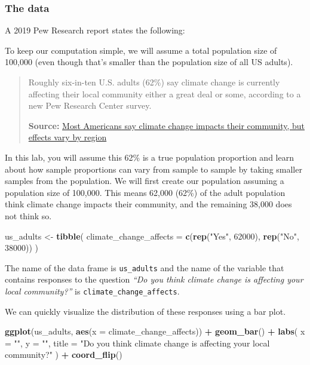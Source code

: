 \documentclass[
]{article}
\newenvironment{Shaded}{\begin{snugshade}}{\end{snugshade}}
\newcommand{\AttributeTok}[1]{\textcolor[rgb]{0.13,0.29,0.53}{#1}}
\newcommand{\DecValTok}[1]{\textcolor[rgb]{0.00,0.00,0.81}{#1}}
\newcommand{\FunctionTok}[1]{\textcolor[rgb]{0.13,0.29,0.53}{\textbf{#1}}}
\newcommand{\NormalTok}[1]{#1}
\newcommand{\OtherTok}[1]{\textcolor[rgb]{0.56,0.35,0.01}{#1}}
\newcommand{\SpecialCharTok}[1]{\textcolor[rgb]{0.81,0.36,0.00}{\textbf{#1}}}
\newcommand{\StringTok}[1]{\textcolor[rgb]{0.31,0.60,0.02}{#1}}
\begin{document}
\subsubsection{The data}\label{the-data}

A 2019 Pew Research report states the following:

To keep our computation simple, we will assume a total population size
of 100,000 (even though that's smaller than the population size of all
US adults).

\begin{quote}
Roughly six-in-ten U.S. adults (62\%) say climate change is currently
affecting their local community either a great deal or some, according
to a new Pew Research Center survey.

\textbf{Source:}
\href{https://www.pewresearch.org/fact-tank/2019/12/02/most-americans-say-climate-change-impacts-their-community-but-effects-vary-by-region/}{Most
Americans say climate change impacts their community, but effects vary
by region}
\end{quote}

In this lab, you will assume this 62\% is a true population proportion
and learn about how sample proportions can vary from sample to sample by
taking smaller samples from the population. We will first create our
population assuming a population size of 100,000. This means 62,000
(62\%) of the adult population think climate change impacts their
community, and the remaining 38,000 does not think so.

\begin{Shaded}
\begin{Highlighting}[]
\NormalTok{us\_adults }\OtherTok{\textless{}{-}} \FunctionTok{tibble}\NormalTok{(}
  \AttributeTok{climate\_change\_affects =} \FunctionTok{c}\NormalTok{(}\FunctionTok{rep}\NormalTok{(}\StringTok{"Yes"}\NormalTok{, }\DecValTok{62000}\NormalTok{), }\FunctionTok{rep}\NormalTok{(}\StringTok{"No"}\NormalTok{, }\DecValTok{38000}\NormalTok{))}
\NormalTok{)}
\end{Highlighting}
\end{Shaded}

The name of the data frame is \texttt{us\_adults} and the name of the
variable that contains responses to the question \emph{``Do you think
climate change is affecting your local community?''} is
\texttt{climate\_change\_affects}.

We can quickly visualize the distribution of these responses using a bar
plot.

\begin{Shaded}
\begin{Highlighting}[]
\FunctionTok{ggplot}\NormalTok{(us\_adults, }\FunctionTok{aes}\NormalTok{(}\AttributeTok{x =}\NormalTok{ climate\_change\_affects)) }\SpecialCharTok{+}
  \FunctionTok{geom\_bar}\NormalTok{() }\SpecialCharTok{+}
  \FunctionTok{labs}\NormalTok{(}
    \AttributeTok{x =} \StringTok{""}\NormalTok{, }\AttributeTok{y =} \StringTok{""}\NormalTok{,}
    \AttributeTok{title =} \StringTok{"Do you think climate change is affecting your local community?"}
\NormalTok{  ) }\SpecialCharTok{+}
  \FunctionTok{coord\_flip}\NormalTok{() }
\end{Highlighting}
\end{Shaded}
\end{document}
